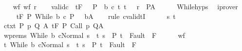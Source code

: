 \begin{isabellebody}
\ \ \isamarkupfalse%
\ wf{\isacharcolon}\ {\isachardoublequoteopen}wf\ r{\isachardoublequoteclose}\isanewline
\ \ \isamarkupfalse%
\ valid{\isacharunderscore}c{\isacharcolon}\ {\isachardoublequoteopen}{\isasymforall}{\isasymsigma}{\isachardot}\ {\isasymGamma}{\isacharcomma}{\isasymTheta}{\isasymTurnstile}\isactrlsub t\isactrlbsub {\isacharslash}F\isactrlesub \ {\isacharparenleft}{\isacharbraceleft}{\isasymsigma}{\isacharbraceright}\ {\isasyminter}\ P\ {\isasyminter}\ b{\isacharparenright}\ c\ {\isacharparenleft}{\isacharbraceleft}t{\isachardot}\ {\isacharparenleft}t{\isacharcomma}\ {\isasymsigma}{\isacharparenright}\ {\isasymin}\ r{\isacharbraceright}\ {\isasyminter}\ P{\isacharparenright}{\isacharcomma}A{\isachardoublequoteclose}\isanewline
\ \ \ \ \isamarkupfalse%
\ While{\isachardot}hyps\ \isamarkupfalse%
\ iprover\isanewline
\ \ \isamarkupfalse%
\ {\isachardoublequoteopen}{\isasymGamma}{\isacharcomma}{\isasymTheta}\ {\isasymTurnstile}\isactrlsub t\isactrlbsub {\isacharslash}F\isactrlesub \ P\ {\isacharparenleft}While\ b\ c{\isacharparenright}\ {\isacharparenleft}P\ {\isasyminter}\ {\isacharminus}\ b{\isacharparenright}{\isacharcomma}A{\isachardoublequoteclose}\isanewline
\ \ \isamarkupfalse%
\ {\isacharparenleft}rule\ cvalidtI{\isacharparenright}\isanewline
\ \ \ \ \isamarkupfalse%
\ s\ t\isanewline
\ \ \ \ \isamarkupfalse%
\ ctxt{\isacharcolon}\ {\isachardoublequoteopen}{\isasymforall}{\isacharparenleft}P{\isacharcomma}\ p{\isacharcomma}\ Q{\isacharcomma}\ A{\isacharparenright}{\isasymin}{\isasymTheta}{\isachardot}\ {\isasymGamma}{\isasymTurnstile}\isactrlsub t\isactrlbsub {\isacharslash}F\isactrlesub \ P\ {\isacharparenleft}Call\ p{\isacharparenright}\ Q{\isacharcomma}A{\isachardoublequoteclose}\isanewline
\ \ \ \ \isamarkupfalse%
\ wprems{\isacharcolon}\ {\isachardoublequoteopen}{\isasymGamma}{\isasymturnstile}{\isasymlangle}While\ b\ c{\isacharcomma}Normal\ s{\isasymrangle}\ {\isasymRightarrow}\ t{\isachardoublequoteclose}\ {\isachardoublequoteopen}s\ {\isasymin}\ P{\isachardoublequoteclose}\ {\isachardoublequoteopen}t\ {\isasymnotin}\ Fault\ {\isacharbackquote}\ F{\isachardoublequoteclose}\isanewline
\ \ \ \ \isamarkupfalse%
\ wf\isanewline
\ \ \ \ \isamarkupfalse%
\ {\isachardoublequoteopen}{\isasymAnd}t{\isachardot}\ {\isasymlbrakk}{\isasymGamma}{\isasymturnstile}{\isasymlangle}While\ b\ c{\isacharcomma}Normal\ s{\isasymrangle}\ {\isasymRightarrow}\ t{\isacharsemicolon}\ s\ {\isasymin}\ P{\isacharsemicolon}\ t\ {\isasymnotin}\ Fault\ {\isacharbackquote}\ F{\isasymrbrakk}\ \isanewline

\end{isabellebody}
